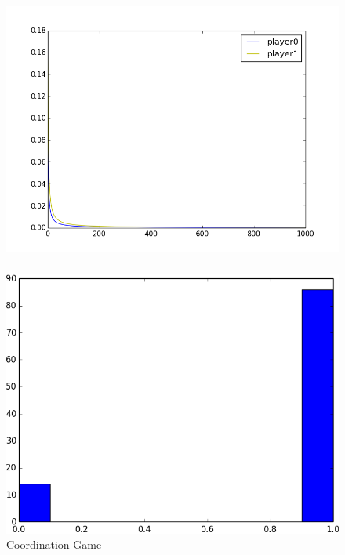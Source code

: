 \documentclass[dvipdfmx,fleqn]{beamer}
\begin{document}
\begin{frame}
\frametitle{}
\begin{figure}
 \centering
 \includegraphics[scale=0.58, bb=100 200 500 300]{coordinationgame_graph2.png}
 \label{fig:coordination_plot2}
\end{figure}
\end{frame}

\begin{frame}
\frametitle{}
\begin{figure}
 \centering
 \includegraphics[scale=0.58, bb=-250 -200 250 200]{coordination_histo1.0.png}
 \caption{Coordination Game}
 \label{fig:coordination_histo}
\end{figure}
\end{frame}
\end{document}
